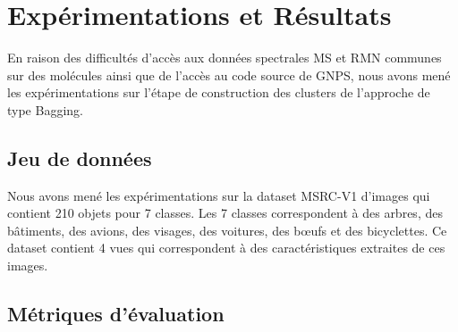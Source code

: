\chapter{Expérimentations et Résultats}

En raison des difficultés d'accès aux données spectrales \acrshort{MS} et \acrshort{RMN} communes sur des molécules ainsi que de l'accès au code source de GNPS, nous avons mené les expérimentations sur l'étape de construction des clusters de l'approche de type Bagging.

\section{Jeu de données}

    Nous avons mené les expérimentations sur la dataset MSRC-V1 d'images qui contient 210 objets pour 7 classes.
    Les 7 classes correspondent à des arbres, des bâtiments, des avions, des visages, des voitures, des bœufs et des bicyclettes.
    Ce dataset contient 4 vues qui correspondent à des caractéristiques extraites de ces images.

\section{Métriques d'évaluation}

